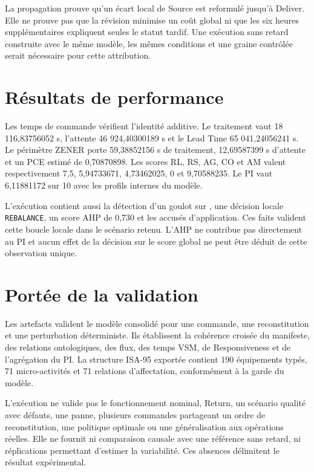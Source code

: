 La propagation prouve qu'un écart local de Source est reformulé jusqu'à Deliver. Elle ne prouve pas que la révision minimise un coût global ni que les six heures supplémentaires expliquent seules le statut tardif. Une exécution sans retard construite avec le même modèle, les mêmes conditions et une graine contrôlée serait nécessaire pour cette attribution.

\section{Résultats de performance}

Les temps de commande vérifient l'identité additive. Le traitement vaut 18 116,83756052 s, l'attente 46 924,40300189 s et le Lead Time 65 041,24056241 s. Le périmètre ZENER porte 59,38852156 s de traitement, 12,69587399 s d'attente et un PCE estimé de 0,70870898. Les scores RL, RS, AG, CO et AM valent respectivement 7,5, 5,94733671, 4,73462025, 0 et 9,70588235. Le PI vaut 6,11881172 sur 10 avec les profils internes du modèle.

L'exécution contient aussi la détection d'un goulot sur , une décision locale \texttt{REBALANCE}, un score AHP de 0,730 et les accusés d'application. Ces faits valident cette boucle locale dans le scénario retenu. L'AHP ne contribue pas directement au PI et aucun effet de la décision sur le score global ne peut être déduit de cette observation unique.

\section{Portée de la validation}

Les artefacts valident le modèle consolidé pour une commande, une reconstitution et une perturbation déterministe. Ils établissent la cohérence croisée du manifeste, des relations ontologiques, des flux, des temps VSM, de Responsiveness et de l'agrégation du PI. La structure ISA-95 exportée contient 190 équipements typés, 71 micro-activités et 71 relations d'affectation, conformément à la garde du modèle.

L'exécution ne valide pas le fonctionnement nominal, Return, un scénario qualité avec défauts, une panne, plusieurs commandes partageant un ordre de reconstitution, une politique optimale ou une généralisation aux opérations réelles. Elle ne fournit ni comparaison causale avec une référence sans retard, ni réplications permettant d'estimer la variabilité. Ces absences délimitent le résultat expérimental.
